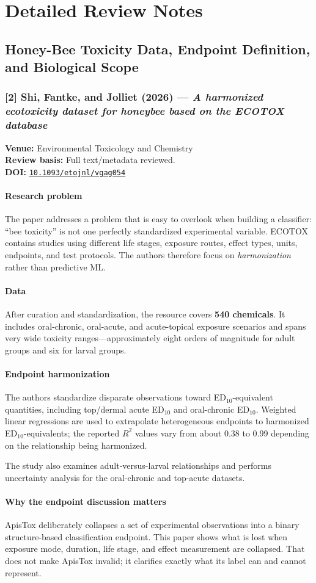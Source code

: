 \documentclass[11pt]{article}
\newcommand{\reviewfield}[2]{\paragraph{#1}#2}
\newcommand{\paperdoi}[1]{\href{https://doi.org/#1}{\texttt{#1}}}
\begin{document}
\newpage
\section{Detailed Review Notes}

\subsection{Honey-Bee Toxicity Data, Endpoint Definition, and Biological Scope}

\subsubsection{[2] Shi, Fantke, and Jolliet (2026) --- \textit{A harmonized ecotoxicity dataset for honeybee based on the ECOTOX database}}
\textbf{Venue:} Environmental Toxicology and Chemistry\\
\textbf{Review basis:} Full text/metadata reviewed.\\
\textbf{DOI:} \paperdoi{10.1093/etojnl/vgag054}

\reviewfield{Research problem}{
The paper addresses a problem that is easy to overlook when building a classifier: ``bee toxicity'' is not one perfectly standardized experimental variable. ECOTOX contains studies using different life stages, exposure routes, effect types, units, endpoints, and test protocols. The authors therefore focus on \emph{harmonization} rather than predictive ML.
}

\reviewfield{Data}{
After curation and standardization, the resource covers \textbf{540 chemicals}. It includes oral-chronic, oral-acute, and acute-topical exposure scenarios and spans very wide toxicity ranges---approximately eight orders of magnitude for adult groups and six for larval groups.
}

\reviewfield{Endpoint harmonization}{
The authors standardize disparate observations toward ED$_{10}$-equivalent quantities, including top/dermal acute ED$_{10}$ and oral-chronic ED$_{10}$. Weighted linear regressions are used to extrapolate heterogeneous endpoints to harmonized ED$_{10}$-equivalents; the reported $R^2$ values vary from about 0.38 to 0.99 depending on the relationship being harmonized.

The study also examines adult-versus-larval relationships and performs uncertainty analysis for the oral-chronic and top-acute datasets.
}

\reviewfield{Why the endpoint discussion matters}{
ApisTox deliberately collapses a set of experimental observations into a binary structure-based classification endpoint. This paper shows what is lost when exposure mode, duration, life stage, and effect measurement are collapsed. That does not make ApisTox invalid; it clarifies exactly what its label can and cannot represent.
}
\end{document}
